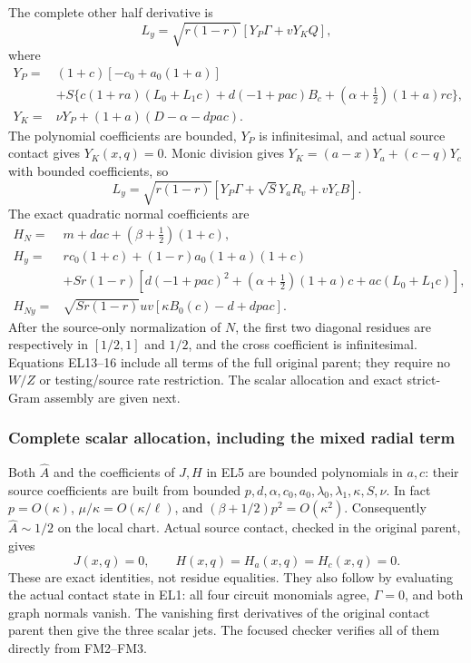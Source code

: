 The complete other half derivative is
\[
 L_y=\sqrt{r(1-r)}[Y_P\Gamma+vY_KQ],             \tag{EL14}
\]
where
\[
\begin{aligned}
 Y_P={}&(1+c)[-c_0+a_0(1+a)]\\
 &+S\{c(1+ra)(L_0+L_1c)+d(-1+pac)B_c
                   +(\alpha+\tfrac12)(1+a)rc\},\\
 Y_K={}&\nu Y_P+(1+a)(D-\alpha-dpac).
\end{aligned}
\]
The polynomial coefficients are bounded, $Y_P$ is infinitesimal,
and actual source contact gives $Y_K(x,q)=0$.  Monic division gives
$Y_K=(a-x)Y_a+(c-q)Y_c$ with bounded coefficients, so
\[
 L_y=\sqrt{r(1-r)}[Y_P\Gamma+\sqrt S Y_aR_v+vY_cB].
                                                               \tag{EL15}
\]
The exact quadratic normal coefficients are
\[
\begin{aligned}
 H_N={}&m+dac+(\beta+\tfrac12)(1+c),\\
 H_y={}&rc_0(1+c)+(1-r)a_0(1+a)(1+c)\\
 &+Sr(1-r)[d(-1+pac)^2+(\alpha+\tfrac12)(1+a)c
                         +ac(L_0+L_1c)],\\
 H_{Ny}={}&\sqrt{Sr(1-r)}uv[\kappa B_0(c)-d+dpac].
\end{aligned}                                                     \tag{EL16}
\]
After the source-only normalization of $N$, the first two diagonal
residues are respectively in $[1/2,1]$ and $1/2$, and the cross
coefficient is infinitesimal.  Equations EL13--16 include all terms
of the full original parent; they require no $W/Z$ or testing/source
rate restriction.  The scalar allocation and exact strict-Gram assembly are given next.


\subsubsection*{Complete scalar allocation, including the mixed radial term}
Both $\widehat A$ and the coefficients of $J,H$ in EL5 are
bounded polynomials in $a,c$: their source coefficients are built
from bounded $p,d,\alpha,c_0,a_0,\lambda_0,\lambda_1,\kappa,S,\nu$.
In fact $p=O(\kappa)$,
$\mu/\kappa=O(\kappa/\ell)$, and
$(\beta+1/2)p^2=O(\kappa^2)$.
Consequently $\widehat A\sim1/2$ on the local chart.
Actual source contact, checked in the original parent, gives
\[
 J(x,q)=0,\qquad H(x,q)=H_a(x,q)=H_c(x,q)=0.        \tag{EL17}
\]
These are exact identities, not residue equalities.  They also follow
by evaluating the actual contact state in EL1: all four circuit
monomials agree, $\Gamma=0$, and both graph normals vanish.
The vanishing first derivatives of the original contact parent
then give the three scalar jets.  The focused checker verifies all
of them directly from FM2--FM3.

